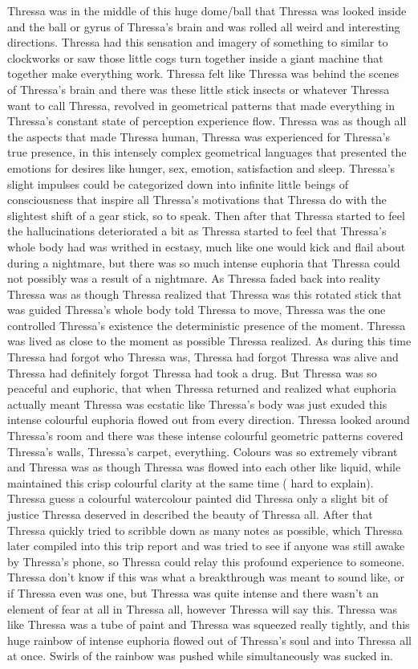 \documentclass[12pt]{book}
\begin{document}
Thressa was in the middle of this huge dome/ball that Thressa was looked inside and the ball or gyrus of Thressa's brain and was rolled all weird and interesting directions. Thressa had this sensation and imagery of something to similar to clockworks or saw those little cogs turn together inside a giant machine that together make everything work. Thressa felt like Thressa was behind the scenes of Thressa's brain and there was these little stick insects or whatever Thressa want to call Thressa, revolved in geometrical patterns that made everything in Thressa's constant state of perception experience flow. Thressa was as though all the aspects that made Thressa human, Thressa was experienced for Thressa's true presence, in this intensely complex geometrical languages that presented the emotions for desires like hunger, sex, emotion, satisfaction and sleep. Thressa's slight impulses could be categorized down into infinite little beings of consciousness that inspire all Thressa's motivations that Thressa do with the slightest shift of a gear stick, so to speak. Then after that Thressa started to feel the hallucinations deteriorated a bit as Thressa started to feel that Thressa's whole body had was writhed in ecstasy, much like one would kick and flail about during a nightmare, but there was so much intense euphoria that Thressa could not possibly was a result of a nightmare. As Thressa faded back into reality Thressa was as though Thressa realized that Thressa was this rotated stick that was guided Thressa's whole body told Thressa to move, Thressa was the one controlled Thressa's existence the deterministic presence of the moment. Thressa was lived as close to the moment as possible Thressa realized. As during this time Thressa had forgot who Thressa was, Thressa had forgot Thressa was alive and Thressa had definitely forgot Thressa had took a drug. But Thressa was so peaceful and euphoric, that when Thressa returned and realized what euphoria actually meant Thressa was ecstatic like Thressa's body was just exuded this intense colourful euphoria flowed out from every direction. Thressa looked around Thressa's room and there was these intense colourful geometric patterns covered Thressa's walls, Thressa's carpet, everything. Colours was so extremely vibrant and Thressa was as though Thressa was flowed into each other like liquid, while maintained this crisp colourful clarity at the same time ( hard to explain). Thressa guess a colourful watercolour painted did Thressa only a slight bit of justice Thressa deserved in described the beauty of Thressa all. After that Thressa quickly tried to scribble down as many notes as possible, which Thressa later compiled into this trip report and was tried to see if anyone was still awake by Thressa's phone, so Thressa could relay this profound experience to someone. Thressa don't know if this was what a breakthrough was meant to sound like, or if Thressa even was one, but Thressa was quite intense and there wasn't an element of fear at all in Thressa all, however Thressa will say this. Thressa was like Thressa was a tube of paint and Thressa was squeezed really tightly, and this huge rainbow of intense euphoria flowed out of Thressa's soul and into Thressa all at once. Swirls of the rainbow was pushed while simultaneously was sucked in. 
\end{document}
